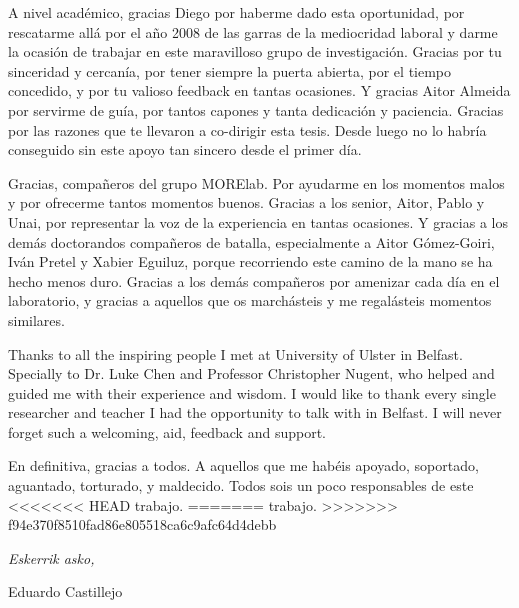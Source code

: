\begin{acknowledgementslong}
A nivel académico, gracias Diego por haberme dado esta oportunidad, por rescatarme
allá por el año 2008 de las garras de la mediocridad laboral y darme la ocasión
de trabajar en este maravilloso grupo de investigación. Gracias por tu sinceridad
y cercanía, por tener siempre la puerta abierta, por el tiempo concedido, y por
tu valioso feedback en tantas ocasiones. Y gracias Aitor Almeida por servirme de
guía, por tantos capones y tanta dedicación y paciencia. Gracias por las razones 
que te llevaron a co-dirigir esta tesis. Desde luego no lo habría conseguido sin 
este apoyo tan sincero desde el primer día.

Gracias, compañeros del grupo MORElab. Por ayudarme en los momentos malos y por
ofrecerme tantos momentos buenos. Gracias a los senior, Aitor, Pablo y Unai, por
representar la voz de la experiencia en tantas ocasiones. Y gracias a los demás
doctorandos compañeros de batalla, especialmente a Aitor Gómez-Goiri, Iván Pretel
y Xabier Eguiluz, porque recorriendo este camino de la mano se ha hecho menos 
duro. Gracias a los demás compañeros por amenizar cada día en el laboratorio, 
y gracias a aquellos que os marchásteis y me regalásteis momentos similares.

Thanks to all the inspiring people I met at University of Ulster in Belfast.
Specially to Dr. Luke Chen and Professor Christopher Nugent, who helped and
guided me with their experience and wisdom. I would like to thank every single
researcher and teacher I had the opportunity to talk with in Belfast. I will
never forget such a welcoming, aid, feedback and support.

En definitiva, gracias a todos. A aquellos que me habéis apoyado, soportado,
aguantado, torturado, y maldecido. Todos sois un poco responsables de este
<<<<<<< HEAD
trabajo. 
=======
trabajo.
>>>>>>> f94e370f8510fad86e805518ca6c9afc64d4debb


\begin{flushright}
\textit{Eskerrik asko,}

Eduardo Castillejo

\monthname \ \the\year







\end{flushright}



\end{acknowledgementslong}



